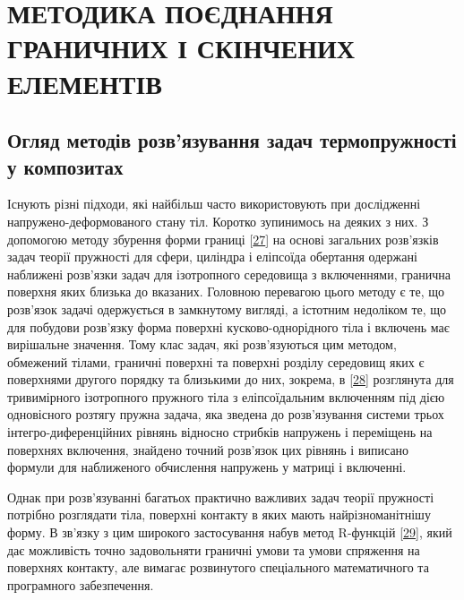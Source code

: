 \chapter{МЕТОДИКА ПОЄДНАННЯ ГРАНИЧНИХ І СКІНЧЕНИХ ЕЛЕМЕНТІВ}

\nocite{bahvalov-et-al,benerdge-et-al} 

\section{Огляд методів розв'язування задач термопружності у композитах}

Існують різні підходи, які найбільш часто використовують при дослідженні напружено-деформованого стану тіл.
Коротко зупинимось на деяких з них. З допомогою методу збурення форми
границі {[}\protect\hyperlink{anchor-15}{27}{]} на основі загальних
розв'язків задач теорії пружності для сфери, циліндра і еліпсоїда
обертання одержані наближені розв'язки задач для ізотропного середовища
з включеннями, гранична поверхня яких близька до вказаних. Головною
перевагою цього методу є те, що розв'язок задачі одержується в
замкнутому вигляді, а істотним недоліком те, що для побудови розв'язку
форма поверхні кусково-однорідного тіла і включень має вирішальне
значення. Тому клас задач, які розв'язуються цим методом, обмежений
тілами, граничні поверхні та поверхні розділу середовищ яких є
поверхнями другого порядку та близькими до них, зокрема, в
{[}\protect\hyperlink{anchor-16}{28}{]} розглянута для тривимірного
ізотропного пружного тіла з еліпсоїдальним включенням під дією
одновісного розтягу пружна задача, яка зведена до розв'язування системи
трьох інтегро-диференційних рівнянь відносно стрибків напружень і
переміщень на поверхнях включення, знайдено точний розв'язок цих рівнянь
і виписано формули для наближеного обчислення напружень у матриці і
включенні.

Однак при розв'язуванні багатьох практично важливих задач теорії
пружності потрібно розглядати тіла, поверхні контакту в яких мають
найрізноманітнішу форму. В зв'язку з цим широкого застосування набув
метод R-функцій {[}\protect\hyperlink{anchor-17}{29}{]}, який дає
можливість точно задовольняти граничні умови та умови спряження на
поверхнях контакту, але вимагає розвинутого спеціального математичного
та програмного забезпечення.

